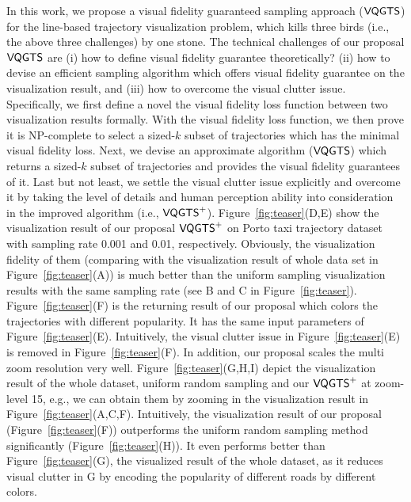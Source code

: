 In this work, we propose a visual fidelity guaranteed sampling approach ($\mathsf{VQGTS}{}$) for the line-based trajectory visualization problem,
which kills three birds (i.e., the above three challenges) by one stone.
The technical challenges of our proposal $\mathsf{VQGTS}{}$ are
(i) how to define visual fidelity guarantee theoretically?
(ii) how to devise an efficient sampling algorithm which offers visual fidelity guarantee on the visualization result,
and (iii) how to overcome the visual clutter issue.
Specifically, we first define a novel the visual fidelity loss function between two visualization results formally.
With the visual fidelity loss function, we then prove it is NP-complete to select a sized-$k$ subset of trajectories which has the minimal visual fidelity loss.
Next, we devise an approximate algorithm ($\mathsf{VQGTS}$) which returns a sized-$k$ subset of trajectories and provides the visual fidelity guarantees of it.
Last but not least, we settle the visual clutter issue explicitly and overcome it by taking the level of details and human perception ability into consideration in the improved algorithm (i.e., $\mathsf{VQGTS}^{+}$).
Figure~\ref{fig:teaser}(D,E) show the visualization result of our proposal $\mathsf{VQGTS}^{+}{}$ on Porto taxi trajectory dataset with sampling rate 0.001 and 0.01, respectively.
Obviously, the visualization fidelity of them (comparing with the visualization result of whole data set in Figure~\ref{fig:teaser}(A)) is much better than
the uniform sampling visualization results with the same sampling rate  (see B and C in Figure~\ref{fig:teaser}).
Figure~\ref{fig:teaser}(F) is the returning result of our proposal which colors the trajectories with different popularity.
It has the same input parameters of Figure~\ref{fig:teaser}(E).
Intuitively, the visual clutter issue in Figure~\ref{fig:teaser}(E) is  removed in Figure~\ref{fig:teaser}(F).
In addition, our proposal scales the multi zoom resolution very well.
Figure~\ref{fig:teaser}(G,H,I) depict the visualization result of the whole dataset, uniform random sampling and our $\mathsf{VQGTS}^{+}$ at zoom-level 15,
e.g., we can obtain them by zooming in the visualization result in Figure~\ref{fig:teaser}(A,C,F).
Intuitively, the visualization result of our proposal (Figure~\ref{fig:teaser}(F)) outperforms the uniform random sampling method significantly (Figure~\ref{fig:teaser}(H)).
It even performs better than Figure~\ref{fig:teaser}(G), the visualized result of the whole dataset, as it reduces visual clutter in G by encoding the popularity of different roads by different colors.

